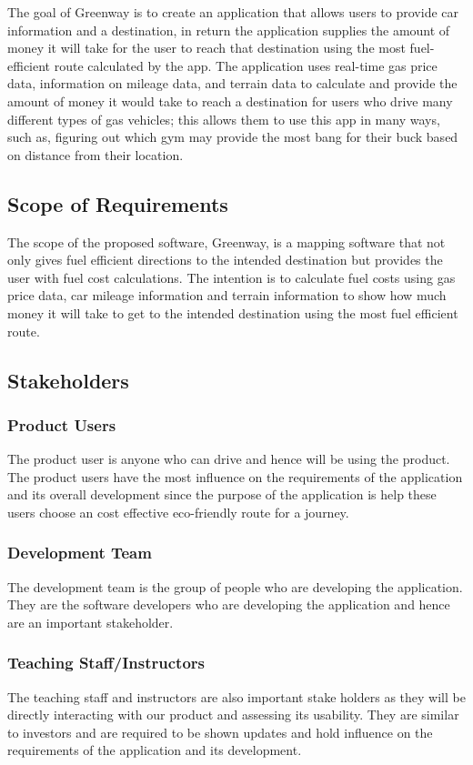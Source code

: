 \documentclass[12pt]{article}
\begin{document}
The goal of Greenway is to create an application that allows users to provide car information and a destination, in return the application supplies the amount of money it will take for the user to reach that destination using the most fuel-efficient route calculated by the app. The application uses real-time gas price data, information on mileage data, and terrain data to calculate and provide the amount of money it would take to reach a destination for users who drive many different types of gas vehicles; this allows them to use this app in many ways, such as, figuring out which gym may provide the most bang for their buck based on distance from their location.

\subsection{Scope of Requirements} 

The scope of the proposed software, Greenway, is a mapping software that not only 
gives fuel efficient directions to the intended destination but provides the user with fuel cost calculations.
The intention is to calculate fuel costs using gas price data, car mileage information and terrain information
to show how much money it will take to get to the intended destination using the most fuel efficient route.

\subsection{Stakeholders}

\subsubsection{Product Users}
The product user is anyone who can drive and hence will be using the product. The product users have the most influence on the requirements of the application and its overall development since the purpose of the application is help these users choose an cost effective eco-friendly route for a journey.

\subsubsection{Development Team}
The development team is the group of people who are developing the application. They are the software developers who are developing the application and hence are an important stakeholder.

\subsubsection{Teaching Staff/Instructors}
The teaching staff and instructors are also important stake holders as they will be directly interacting with our product and assessing its usability. They are similar to investors and are required to be shown updates and hold influence on the requirements of the application and its development.
\end{document}
